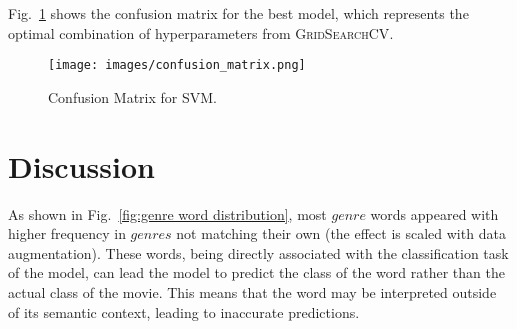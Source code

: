\documentclass[3pt, sigconf, nonacm]{acmart}
\begin{document}
\begin{table}[h]
\centering
\caption{\footnotesize Per-Hyperparameter Metrics.}
\label{tab:per-iteration}
\end{table}

Fig.~\ref{fig:confusion matrix} shows the confusion matrix for the best model, which represents the optimal combination of hyperparameters from \textsc{GridSearchCV}.


\begin{figure}[h]
    \centering
    \texttt{[image: images/confusion\_matrix.png]}
    \caption{\footnotesize Confusion Matrix for SVM.}
    \Description{~}
    \label{fig:confusion matrix}
\end{figure}

\section{Discussion}


As shown in Fig.~\ref{fig:genre word distribution}, most $genre$ words appeared with higher frequency in $genres$ not matching their own (the effect is scaled with data augmentation). These words, being directly associated with the classification task of the model, can lead the model to predict the class of the word rather than the actual class of the movie. This means that the word may be interpreted outside of its semantic context, leading to inaccurate predictions.
\end{document}
